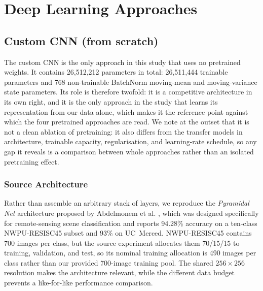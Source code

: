 \documentclass[11pt,twoside,a4paper]{article}
\begin{document}
\section{Deep Learning Approaches}
\subsection{Custom CNN (from scratch)}
\label{sec:customcnn}

The custom CNN is the only approach in this study that uses no pretrained
weights. It contains 26,512,212 parameters in total: 26,511,444 trainable
parameters and 768 non-trainable BatchNorm moving-mean and moving-variance
state parameters. Its role is therefore twofold: it is a competitive
architecture in its own right, and it is the only approach in the study that
learns its representation from our data alone, which makes it the reference
point against which the four pretrained approaches are read. We note at the
outset that it is not a clean ablation of pretraining: it also differs from
the transfer models in architecture, trainable capacity, regularisation, and
learning-rate schedule, so any gap it reveals is a comparison between whole
approaches rather than an isolated pretraining effect.

\subsubsection{Source Architecture}

Rather than assemble an arbitrary stack of layers, we reproduce the
\emph{Pyramidal Net} architecture proposed by Abdelmonem et al.
\cite{Abdelmonem2026}, which was designed specifically for remote-sensing scene
classification and reports 94.28\% accuracy on a ten-class NWPU-RESISC45 subset
and 93\% on UC~Merced. NWPU-RESISC45 contains 700 images per class, but the
source experiment allocates them 70/15/15 to training, validation, and test, so
its nominal training allocation is 490 images per class rather than our
provided 700-image training pool. The shared $256 \times 256$ resolution makes
the architecture relevant, while the different data budget prevents a
like-for-like performance comparison.
\end{document}
